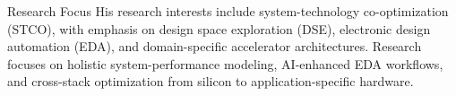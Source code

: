 \begin{rubric}{Research Focus}
%
%
%
\entry*[]
His research interests include system-technology co-optimization (STCO), with emphasis on design space exploration (DSE), electronic design automation (EDA), and domain-specific accelerator architectures. Research focuses on holistic system-performance modeling, AI-enhanced EDA workflows, and cross-stack optimization from silicon to application-specific hardware.
\end{rubric}